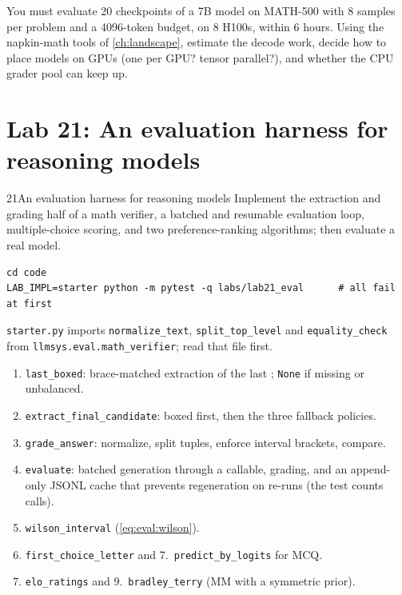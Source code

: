 \begin{exercise}
You must evaluate 20 checkpoints of a 7B model on MATH-500 with 8 samples per problem and a
4096-token budget, on 8 H100s, within 6 hours. Using the napkin-math tools of \cref{ch:landscape},
estimate the decode work, decide how to place models on GPUs (one per GPU? tensor parallel?), and
whether the CPU grader pool can keep up.
\end{exercise}

\section{Lab 21: An evaluation harness for reasoning models}\label{sec:eval:lab}

\begin{labbox}{21}{An evaluation harness for reasoning models}
Implement the extraction and grading half of a math verifier, a batched and resumable evaluation
loop, multiple-choice scoring, and two preference-ranking algorithms; then evaluate a real model.

\begin{lstlisting}[style=shell]
cd code
LAB_IMPL=starter python -m pytest -q labs/lab21_eval      # all fail at first
\end{lstlisting}
\texttt{starter.py} imports \texttt{normalize\_text}, \texttt{split\_top\_level} and
\texttt{equality\_check} from \texttt{llmsys.eval.math\_verifier}; read that file first.

\begin{enumerate}
  \item \texttt{last\_boxed}: brace-matched extraction of the last \bx{}; \texttt{None} if missing
  or unbalanced.
  \item \texttt{extract\_final\_candidate}: boxed first, then the three fallback policies.
  \item \texttt{grade\_answer}: normalize, split tuples, enforce interval brackets, compare.
  \item \texttt{evaluate}: batched generation through a callable, grading, and an append-only JSONL
  cache that prevents regeneration on re-runs (the test counts calls).
  \item \texttt{wilson\_interval} (\cref{eq:eval:wilson}).
  \item \texttt{first\_choice\_letter} and 7.\ \texttt{predict\_by\_logits} for MCQ.
  \setcounter{enumi}{7}
  \item \texttt{elo\_ratings} and 9.\ \texttt{bradley\_terry} (MM with a symmetric prior).
\end{enumerate}


\end{labbox}
